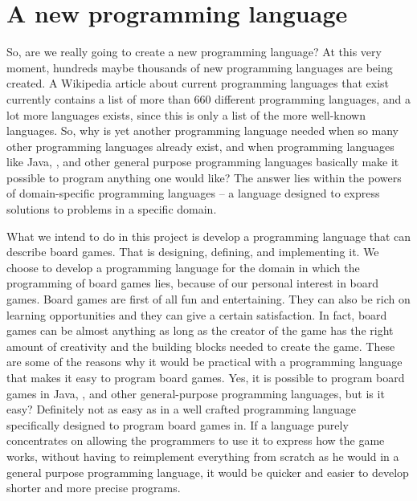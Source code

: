 \chapter{A new programming language}
\label{chap:introduction}

So, are we really going to create a new programming language? At this very
moment, hundreds maybe thousands of new programming languages are being created.
A Wikipedia article about current programming languages that exist currently
contains a list of more than $660$ different programming languages\cite{listofprogramminglanguages}, and a lot more languages exists, since this
is only a list of the more well-known languages. So, why is yet another
programming language needed when so many other programming languages
already exist, and when programming languages like Java, \CS{}, and other general purpose
programming languages basically make it possible to program anything one would
like? The answer lies within the powers of domain-specific programming languages
-- a language designed to express solutions to problems in a specific
domain\cite{domainspecificprogramminglanguagedefinition}.

What we intend to do in this project is develop a programming language that can
describe board games. That is designing, defining, and implementing it. We
choose to develop a programming language for the domain in which the programming
of board games lies, because of our personal interest in board games.
Board games are first of all fun and entertaining. They can also be rich on
learning opportunities\cite{whyboardgames1?} and they can give a certain
satisfaction\cite{whyboardgames2?}. In fact, board games can be almost anything
as long as the creator of the game has the right amount of creativity and the
building blocks needed to create the game. These are some of the reasons why it
would be practical with a programming language that makes it easy to program
board games. Yes, it is possible to program board games in Java, \CS{}, and 
other general-purpose programming languages, but is it easy? Definitely not as
easy as in a well crafted programming language specifically designed to program
board games in. If a language purely concentrates on allowing the programmers to
use it to express how the game works, without having to reimplement everything
from scratch as he would in a general purpose programming language, it would be
quicker and easier to develop shorter and more precise programs.  

